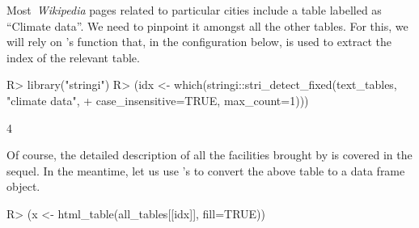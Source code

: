 \documentclass[nojss]{jss}
\begin{document}
Most~\textit{Wikipedia} pages related to particular cities
include a table labelled as ``Climate data''.
We need to pinpoint it amongst all the other tables.
For this, we will rely on 's
  function that, in the configuration
below, is used to extract the index of the relevant table.

\begin{Schunk}
\begin{Sinput}
R> library("stringi")
R> (idx <- which(stringi::stri_detect_fixed(text_tables, "climate data",
+    case_insensitive=TRUE, max_count=1)))
\end{Sinput}
\begin{Soutput}
[1] 4
\end{Soutput}
\end{Schunk}

Of course, the detailed description of all the facilities
brought by  is covered in the sequel.
In the meantime, let us use 's 
to convert the above table to a data frame object.


\begin{Schunk}
\begin{Sinput}
R> (x <- html_table(all_tables[[idx]], fill=TRUE))
\end{Sinput}
\end{Schunk}
\end{document}
